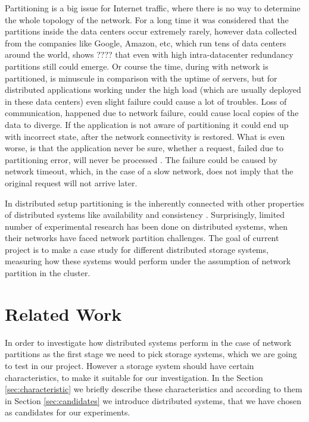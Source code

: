\documentclass[a4paper]{article}
\begin{document}
Partitioning is a big issue for Internet traffic, where there is no way to determine the whole topology of the network.
For a long time it was considered that the partitions inside the data centers occur extremely rarely, however data collected from the companies like Google, Amazon, etc, which run tens of data centers around the world, shows ???? that even with high intra-datacenter redundancy partitions still could emerge.
Or course the time, during with network is partitioned, is minuscule in comparison with the uptime of servers, but for distributed applications working under the high load (which are usually deployed in these data centers) even slight failure could cause a lot of troubles.
Loss of communication, happened due to network failure, could cause local copies of the data to diverge.
If the application is not aware of partitioning it could end up with incorrect state, after the network connectivity is restored.
What is even worse, is that the application never be sure, whether a request, failed due to partitioning error, will never be processed . 
The failure could be caused by network timeout, which, in the case of a slow network, does not imply that the original request will not arrive later.

In distributed setup partitioning is the inherently connected with other properties of distributed systems like availability and consistency \cite{brewer2000towards}.
Surprisingly, limited number of experimental research has been done on distributed systems, when their networks have faced network partition challenges. 
The goal of current project is to make a case study for different distributed storage systems, measuring how these systems would perform under the assumption of network partition in the cluster.


\section{Related Work}

In order to investigate how distributed systems perform in the case of network partitions as the first stage we need to pick storage systems, which we are going to test in our project.
However a storage system should have certain characteristics, to make it suitable for our investigation. 
In the Section \ref{sec:characteristic} we briefly describe these characteristics and according to them in Section \ref{sec:candidates} we introduce distributed systems, that we have chosen as candidates for our experiments.
\end{document}
